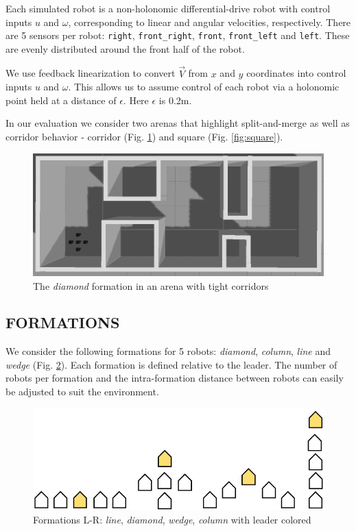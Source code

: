 \documentclass[letterpaper, 10 pt, conference]{ieeeconf}  %
\begin{document}
Each simulated robot is a non-holonomic differential-drive robot with control inputs $u$ and $\omega$, corresponding to linear and angular velocities, respectively. There are 5 sensors per robot: \texttt{right}, \texttt{front\_right}, \texttt{front}, \texttt{front\_left} and \texttt{left}. These are evenly distributed around the front half of the robot.

We use feedback linearization to convert $\vec{V}$ from $x$ and $y$ coordinates into control inputs $u$ and $\omega$. This allows us to assume control of each robot via a holonomic point held at a distance of $\epsilon$. Here $\epsilon$ is 0.2m.

In our evaluation we consider two arenas that highlight split-and-merge as well as corridor behavior -  corridor (Fig. \ref{fig:corridorworld}) and square (Fig. \ref{fig:square}). 

\begin{figure}[thpb]
\centering
\includegraphics[width=\linewidth]{images/corridorworld.png}
\caption{The \textit{diamond} formation in an arena with tight corridors}
\label{fig:corridorworld}
\end{figure}

\subsection{FORMATIONS}

We consider the following formations for 5 robots: \textit{diamond}, \textit{column}, \textit{line} and \textit{wedge} (Fig. \ref{formation_shapes}). Each formation is defined relative to the leader. The number of robots per formation and the intra-formation distance between robots can easily be adjusted to suit the environment.

\begin{figure}[thpb]
\centering
\includegraphics[width=0.7\linewidth]{images/formation_shapes.jpg}
\caption{Formations L-R: \textit{line}, \textit{diamond}, \textit{wedge}, \textit{column} with leader colored}
\label{formation_shapes}
\end{figure}
\end{document}
